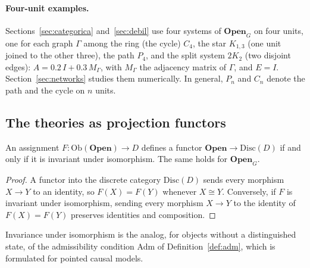 \paragraph{Four-unit examples.} Sections~\ref{sec:categorica} and~\ref{sec:debil} use four systems of $\mathbf{Open}_G$ on four units, one for each graph $\Gamma$ among the ring (the cycle) $C_4$, the star $K_{1,3}$ (one unit joined to the other three), the path $P_4$, and the split system $2K_2$ (two disjoint edges): $A=0.2\,I+0.3\,M_\Gamma$, with $M_\Gamma$ the adjacency matrix of $\Gamma$, and $E=I$. Section~\ref{sec:networks} studies them numerically. In general, $P_n$ and $C_n$ denote the path and the cycle on $n$ units.

\subsection{The theories as projection functors}\label{sec:proyecciones}
\begin{proposition}\label{prop:funtor}
An assignment $F:\mathrm{Ob}(\mathbf{Open})\to D$ defines a functor $\mathbf{Open}\to\mathrm{Disc}(D)$ if and only if it is invariant under isomorphism. The same holds for $\mathbf{Open}_G$.
\end{proposition}
\begin{proof}
A functor into the discrete category $\mathrm{Disc}(D)$ sends every morphism $X\to Y$ to an identity, so $F(X)=F(Y)$ whenever $X\cong Y$. Conversely, if $F$ is invariant under isomorphism, sending every morphism $X\to Y$ to the identity of $F(X)=F(Y)$ preserves identities and composition.
\end{proof}
Invariance under isomorphism is the analog, for objects without a distinguished state, of the admissibility condition Adm of Definition~\ref{def:adm}, which is formulated for pointed causal models.

